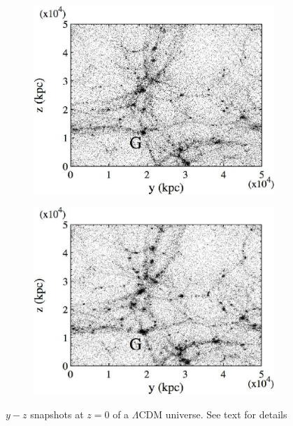 \documentclass{article}
\begin{document}
\begin{figure}
\begin{subfigure}[b]{0.45\textwidth}
         \centering
         \includegraphics[width=\textwidth]{images/1c.PNG}
         \caption{}
         \label{fig:1c}
     \end{subfigure}
     \hfill
     \begin{subfigure}[b]{0.45\textwidth}
         \centering
         \includegraphics[width=\textwidth]{images/1d.PNG}
         \caption{}
         \label{fig:1d}
     \end{subfigure}
        \caption{$y-z$ snapshots at $z=0$ of a $\Lambda$CDM universe. See text for details}
        \label{fig:1}
\end{figure}
\end{document}
